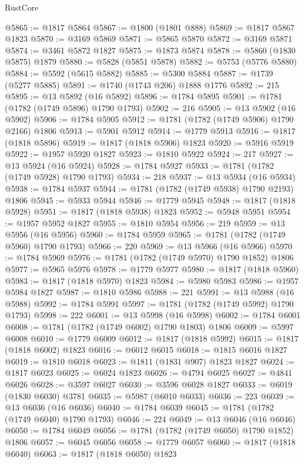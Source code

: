 \begin{lexlean}{RustCore}
\begin{coremodule}
@5865 := @1817 @5864
@5867 := @1800 (@1801 @888)
@5869 := @1817 @5867 @1823
@5870 := @3169 @5869
@5871 := @5865 @5870
@5872 := @3169 @5871
@5874 := @3461 @5872 @1827
@5875 := @1873 @5874
@5878 := @5860 (@1830 @5875) @1879
@5880 := @5828 (@5851 @5878)
@5882 := @5753 (@5776 @5880)
@5884 := @5592 (@5615 @5882)
@5885 := @5300 @5884
@5887 := @1739 (@5277 @5885)
@5891 := @1740 (@1743 @206) @1888 @1776
@5892 := 215
@5895 := @13 @5892 (@16 @5892)
@5896 := @1784 @5895
@5901 := @1781 (@1782 (@1749 @5896) @1790 @1793)
@5902 := 216
@5905 := @13 @5902 (@16 @5902)
@5906 := @1784 @5905
@5912 := @1781 (@1782 (@1749 @5906) @1790 @2166) @1806
@5913 := @5901 @5912
@5914 := @1779 @5913
@5916 := @1817 (@1818 @5896)
@5919 := @1817 (@1818 @5906) @1823
@5920 := @5916 @5919
@5922 := @1957 @5920 @1827
@5923 := @1810 @5922
@5924 := 217
@5927 := @13 @5924 (@16 @5924)
@5928 := @1784 @5927
@5933 := @1781 (@1782 (@1749 @5928) @1790 @1793)
@5934 := 218
@5937 := @13 @5934 (@16 @5934)
@5938 := @1784 @5937
@5944 := @1781 (@1782 (@1749 @5938) @1790 @2193) @1806
@5945 := @5933 @5944
@5946 := @1779 @5945
@5948 := @1817 (@1818 @5928)
@5951 := @1817 (@1818 @5938) @1823
@5952 := @5948 @5951
@5954 := @1957 @5952 @1827
@5955 := @1810 @5954
@5956 := 219
@5959 := @13 @5956 (@16 @5956)
@5960 := @1784 @5959
@5965 := @1781 (@1782 (@1749 @5960) @1790 @1793)
@5966 := 220
@5969 := @13 @5966 (@16 @5966)
@5970 := @1784 @5969
@5976 := @1781 (@1782 (@1749 @5970) @1790 @1852) @1806
@5977 := @5965 @5976
@5978 := @1779 @5977
@5980 := @1817 (@1818 @5960)
@5983 := @1817 (@1818 @5970) @1823
@5984 := @5980 @5983
@5986 := @1957 @5984 @1827
@5987 := @1810 @5986
@5988 := 221
@5991 := @13 @5988 (@16 @5988)
@5992 := @1784 @5991
@5997 := @1781 (@1782 (@1749 @5992) @1790 @1793)
@5998 := 222
@6001 := @13 @5998 (@16 @5998)
@6002 := @1784 @6001
@6008 := @1781 (@1782 (@1749 @6002) @1790 @1803) @1806
@6009 := @5997 @6008
@6010 := @1779 @6009
@6012 := @1817 (@1818 @5992)
@6015 := @1817 (@1818 @6002) @1823
@6016 := @6012 @6015
@6018 := @1815 @6016 @1827
@6019 := @1810 @6018
@6023 := @1811 (@1831 @907) @1823 @1827
@6024 := @1817 @6023
@6025 := @6024 @1823
@6026 := @4794 @6025
@6027 := @4841 @6026
@6028 := @3597 @6027
@6030 := @3596 @6028 @1827
@6033 := @6019 (@1830 @6030) @3781
@6035 := @5987 (@6010 @6033)
@6036 := 223
@6039 := @13 @6036 (@16 @6036)
@6040 := @1784 @6039
@6045 := @1781 (@1782 (@1749 @6040) @1790 @1793)
@6046 := 224
@6049 := @13 @6046 (@16 @6046)
@6050 := @1784 @6049
@6056 := @1781 (@1782 (@1749 @6050) @1790 @1852) @1806
@6057 := @6045 @6056
@6058 := @1779 @6057
@6060 := @1817 (@1818 @6040)
@6063 := @1817 (@1818 @6050) @1823

\end{coremodule}
\end{lexlean}
